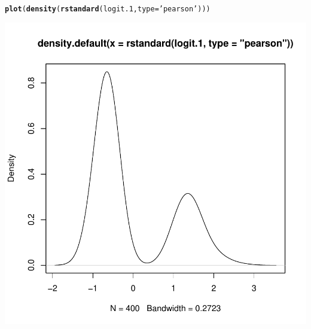 \documentclass[onesided]{article}\usepackage[]{graphicx}\usepackage[]{color}
\makeatletter
\def\maxwidth{ %
  \ifdim\Gin@nat@width>\linewidth
    \linewidth
  \else
    \Gin@nat@width
  \fi
}
\newcommand{\hlstr}[1]{\textcolor[rgb]{0.192,0.494,0.8}{#1}}%
\newcommand{\hlstd}[1]{\textcolor[rgb]{0.345,0.345,0.345}{#1}}%
\newcommand{\hlkwc}[1]{\textcolor[rgb]{0.333,0.667,0.333}{#1}}%
\newcommand{\hlkwd}[1]{\textcolor[rgb]{0.737,0.353,0.396}{\textbf{#1}}}%
\newenvironment{kframe}{%
 \def\at@end@of@kframe{}%
 \ifinner\ifhmode%
  \def\at@end@of@kframe{\end{minipage}}%
  \begin{minipage}{\columnwidth}%
 \fi\fi%
 \def\FrameCommand##1{\hskip\@totalleftmargin \hskip-\fboxsep
 \colorbox{shadecolor}{##1}\hskip-\fboxsep
     \hskip-\linewidth \hskip-\@totalleftmargin \hskip\columnwidth}%
 \MakeFramed {\advance\hsize-\width
   \@totalleftmargin\z@ \linewidth\hsize
   \@setminipage}}%
 {\par\unskip\endMakeFramed%
 \at@end@of@kframe}
\newenvironment{knitrout}{}{} %
\makeatother
\begin{document}
\begin{knitrout}
\color{fgcolor}\begin{kframe}
\begin{alltt}
\hlkwd{plot}\hlstd{(}\hlkwd{density}\hlstd{(}\hlkwd{rstandard}\hlstd{(logit.1,} \hlkwc{type}\hlstd{=}\hlstr{'pearson'}\hlstd{)))}
\end{alltt}
\end{kframe}

{\centering \includegraphics[width=\maxwidth]{figure/r:pearson:plot-1} 

}



\end{knitrout}
\end{document}
